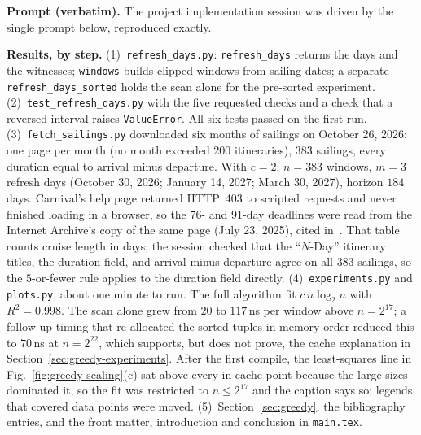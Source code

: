 \textbf{Prompt (verbatim).} The project implementation session was driven by the
single prompt below, reproduced exactly.



\textbf{Results, by step.}
(1)~\texttt{refresh\_days.py}: \texttt{refresh\_days} returns the days and
the witnesses; \texttt{windows} builds clipped windows from sailing dates; a
separate \texttt{refresh\_days\_sorted} holds the scan alone for the
pre-sorted experiment.
(2)~\texttt{test\_refresh\_days.py} with the five requested checks and a
check that a reversed interval raises \texttt{ValueError}. All six tests
passed on the first run.
(3)~\texttt{fetch\_sailings.py} downloaded six months of sailings on
October 26, 2026: one page per month (no month exceeded $200$ itineraries),
$383$ sailings, every duration equal to arrival minus departure. With
$c=2$: $n=383$ windows, $m=3$ refresh days (October 30, 2026; January 14,
2027; March 30, 2027), horizon $184$ days. Carnival's help page returned
HTTP~403 to scripted requests and never finished loading in a browser, so the
$76$- and $91$-day deadlines were read from the Internet Archive's copy of
the same page (July 23, 2025), cited in~\cite{carnival481}. That table counts
cruise length in days; the session checked that the ``$N$-Day'' itinerary
titles, the duration field, and arrival minus departure agree on all $383$
sailings, so the $5$-or-fewer rule applies to the duration field directly.
(4)~\texttt{experiments.py} and \texttt{plots.py}, about one minute to run.
The full algorithm fit $c\,n\log_2 n$ with $R^2=0.998$. The scan alone grew
from $20$ to $117$\,ns per window above $n=2^{17}$; a follow-up timing that
re-allocated the sorted tuples in memory order reduced this to $70$\,ns at
$n=2^{22}$, which supports, but does not prove, the cache explanation in
Section~\ref{sec:greedy-experiments}. After the first compile, the
least-squares line in Fig.~\ref{fig:greedy-scaling}(c) sat above every
in-cache point because the large sizes dominated it, so the fit was
restricted to $n\le2^{17}$ and the caption says so; legends that covered
data points were moved.
(5)~Section~\ref{sec:greedy}, the bibliography entries, and the front
matter, introduction and conclusion in \texttt{main.tex}.
